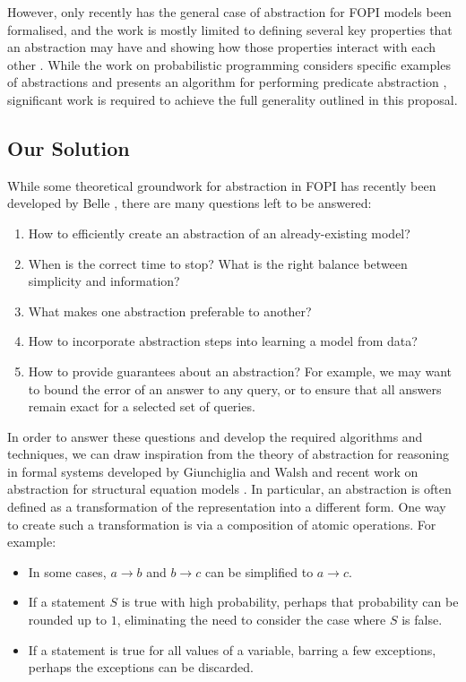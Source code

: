 \documentclass[11pt,english,twocolumn]{article}
\begin{document}
However, only recently has the general case of abstraction for FOPI models been
formalised, and the work is mostly limited to defining several key properties
that an abstraction may have and showing how those properties interact with each
other \cite{DBLP:journals/corr/abs-1810-02434}. While the work on probabilistic
programming considers specific examples of abstractions
\cite{DBLP:conf/uai/HoltzenMB17} and presents an algorithm for performing
predicate abstraction \cite{DBLP:conf/icml/HoltzenBM18}, significant work is
required to achieve the full generality outlined in this proposal.

\subsection*{Our Solution} \label{section:our_solution} %

While some theoretical groundwork for abstraction in FOPI has recently been
developed by Belle \cite{DBLP:journals/corr/abs-1810-02434}, there are many
questions left to be answered:
\begin{enumerate}
\item How to efficiently create an abstraction of an already-existing
  model? \label{q:1}
\item When is the correct time to stop? What is the right balance between
  simplicity and information? \label{q:2}
\item What makes one abstraction preferable to another? \label{q:3}
\item How to incorporate abstraction steps into learning a model from
  data? \label{q:4}
\item How to provide guarantees about an abstraction? For example, we may want
  to bound the error of an answer to any query, or to ensure that all answers
  remain exact for a selected set of queries. \label{q:5}
\end{enumerate}

In order to answer these questions and develop the required algorithms and
techniques, we can draw inspiration from the theory of abstraction for reasoning
in formal systems developed by Giunchiglia and Walsh
\cite{DBLP:journals/ai/GiunchigliaW92} and recent work on abstraction for
structural equation models \cite{DBLP:conf/uai/RubensteinWBMJG17}. In
particular, an abstraction is often defined as a transformation of the
representation into a different form. One way to create such a transformation is
via a composition of atomic operations. For example:
\begin{itemize}
\item In some cases, $a \rightarrow b$ and $b \rightarrow c$ can be simplified
  to $a \rightarrow c$.
\item If a statement $S$ is true with high probability, perhaps that probability
  can be rounded up to $1$, eliminating the need to consider the case where $S$
  is false.
\item If a statement is true for all values of a variable, barring a few
  exceptions, perhaps the exceptions can be discarded.
\end{itemize}
\end{document}
